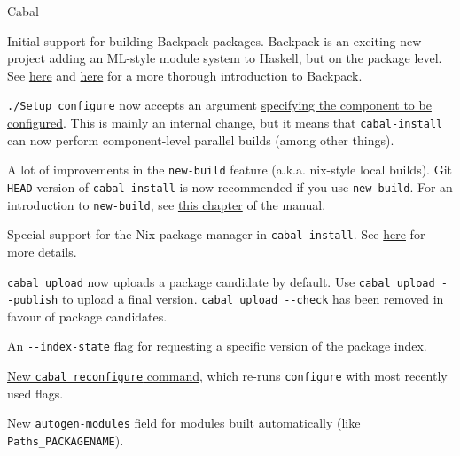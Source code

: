 \begin{hcarentry}{Cabal}
\begin{compactitem}
\item Initial support for building Backpack packages. Backpack is an
  exciting new project adding an ML-style module system to Haskell,
  but on the package level. See
  \href{https://github.com/ezyang/ghc-proposals/blob/backpack/proposals/0000-backpack.rst}{here}
  and \href{http://blog.ezyang.com/category/haskell/backpack/}{here}
  for a more thorough introduction to Backpack.

\item \texttt{./Setup configure} now accepts an argument
  \href{https://github.com/ghc-proposals/ghc-proposals/pull/4}{specifying
    the component to be configured}. This is mainly an internal
  change, but it means that \texttt{cabal-install} can now perform
  component-level parallel builds (among other things).

\item A lot of improvements in the \texttt{new-build} feature
  (a.k.a. nix-style local builds). Git \texttt{HEAD} version of
  \texttt{cabal-install} is now recommended if you use
  \texttt{new-build}. For an introduction to \texttt{new-build}, see
  \href{http://cabal.readthedocs.io/en/latest/nix-local-build-overview.html}{this
    chapter} of the manual.

\item Special support for the Nix package manager in
  \texttt{cabal-install}. See
  \href{http://cabal.readthedocs.io/en/latest/nix-integration.html}{here}
  for more details.

\item \texttt{cabal upload} now uploads a package candidate by
  default. Use \texttt{cabal upload -{}-publish} to upload a final
  version. \texttt{cabal upload -{}-check} has been removed in favour
  of package candidates.

\item
  \href{http://cabal.readthedocs.io/en/latest/nix-local-build.html#cfg-field-index-state}{An
    \texttt{-{}-index-state} flag} for requesting a specific version
  of the package index.

\item \href{https://github.com/haskell/cabal/pull/3818}{New \texttt{cabal reconfigure} command}, which re-runs
  \texttt{configure} with most recently used flags.

\item
  \href{http://cabal.readthedocs.io/en/latest/developing-packages.html#autogenerated-modules}{New
    \texttt{autogen-modules} field} for modules built automatically
  (like \texttt{Paths\_PACKAGENAME}).


\end{compactitem}
\end{hcarentry}
